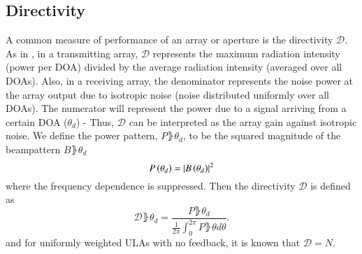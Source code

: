 \subsection{Directivity}
A common measure of performance of an array or aperture is the directivity $\mathcal{D}$.
As in \cite{van2004optimum}, in a transmitting array, $\mathcal{D}$ represents the maximum radiation intensity (power per DOA) divided by the average radiation intensity (averaged over all DOAs).
Also, in a receiving array, the denominator represents the noise power at the array output due to isotropic noise (noise distributed uniformly over all DOAs). 
The numerator will represent the power due to a signal arriving from a certain DOA ($\theta_{d}$) - Thus, $\mathcal{D}$ can be interpreted as the array gain against isotropic noise.
We define the power pattern, $P\rBrace{\theta_{d}}$, to be the squared magnitude of the beampattern $B\rBrace{\theta_{d}}$
\begin{equation}
    P\left({\theta_{d}}\right) = \left\vert B\left({\theta_{d}}\right)\right\vert^{2}
\end{equation}
where the frequency dependence is suppressed.
Then the directivity $\mathcal{D}$ is defined as
\begin{equation}\label{eq_D}
    \mathcal{D}\rBrace{\theta_{d}} = \frac{
    P\rBrace{\theta_{d}}
    }{
    \frac{1}{2\pi}\int_{0}^{2\pi}P\rBrace{\theta}d\theta
    }.
\end{equation}
and for uniformly weighted ULAs with no feedback, it is known \cite{van2004optimum} that $\mathcal{D} = N$.
